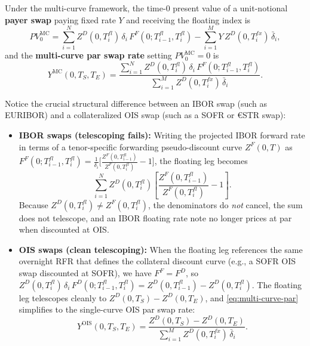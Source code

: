 Under the multi-curve framework, the time-$0$ present value of a unit-notional \textbf{payer swap} paying fixed rate $Y$ and receiving the floating index is
\begin{equation}\label{eq:multi-curve-irs}
PV_0^{\mathrm{MC}} = \sum_{i=1}^N Z^D(0, T_i^{fl})\,\delta_i\,F^F(0; T_{i-1}^{fl}, T_i^{fl}) - \sum_{i=1}^M Y\,Z^D(0, T_i^{fx})\,\bar{\delta}_i,
\end{equation}
and the \textbf{multi-curve par swap rate} setting $PV_0^{\mathrm{MC}} = 0$ is
\begin{equation}\label{eq:multi-curve-par}
Y^{\mathrm{MC}}(0, T_S, T_E) = \frac{\sum_{i=1}^N Z^D(0, T_i^{fl})\,\delta_i\,F^F(0; T_{i-1}^{fl}, T_i^{fl})}{\sum_{i=1}^M Z^D(0, T_i^{fx})\,\bar{\delta}_i}.
\end{equation}

Notice the crucial structural difference between an IBOR swap (such as EURIBOR) and a collateralized OIS swap (such as a SOFR or €STR swap):
\begin{itemize}
    \item \textbf{IBOR swaps (telescoping fails):} Writing the projected IBOR forward rate in terms of a tenor-specific forwarding pseudo-discount curve $Z^F(0, T)$ as $F^F(0; T_{i-1}^{fl}, T_i^{fl}) = \frac{1}{\delta_i}\bigl[\frac{Z^F(0, T_{i-1}^{fl})}{Z^F(0, T_i^{fl})} - 1\bigr]$, the floating leg becomes
    \[
    \sum_{i=1}^N Z^D(0, T_i^{fl})\!\left[\frac{Z^F(0, T_{i-1}^{fl})}{Z^F(0, T_i^{fl})} - 1\right].
    \]
    Because $Z^D(0, T_i^{fl}) \neq Z^F(0, T_i^{fl})$, the denominators do \emph{not} cancel, the sum does not telescope, and an IBOR floating rate note no longer prices at par when discounted at OIS.
    \item \textbf{OIS swaps (clean telescoping):} When the floating leg references the same overnight RFR that defines the collateral discount curve (e.g., a SOFR OIS swap discounted at SOFR), we have $F^F = F^D$, so $Z^D(0, T_i^{fl})\,\delta_i\,F^D(0; T_{i-1}^{fl}, T_i^{fl}) = Z^D(0, T_{i-1}^{fl}) - Z^D(0, T_i^{fl})$. The floating leg telescopes cleanly to $Z^D(0, T_S) - Z^D(0, T_E)$, and \eqref{eq:multi-curve-par} simplifies to the single-curve OIS par swap rate:
    \begin{equation}\label{eq:ois-par-rate}
    Y^{\mathrm{OIS}}(0, T_S, T_E) = \frac{Z^D(0, T_S) - Z^D(0, T_E)}{\sum_{i=1}^M Z^D(0, T_i^{fx})\,\bar{\delta}_i}.
    \end{equation}
\end{itemize}

